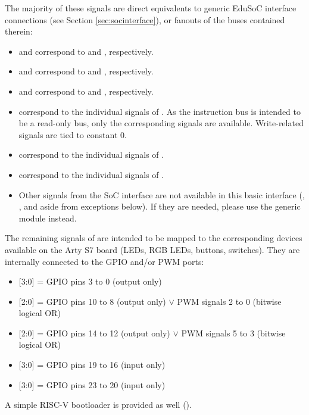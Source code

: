 The majority of these signals are direct equivalents to generic EduSoC interface connections (see Section \ref{sec:socinterface}), or fanouts of the buses contained therein:
\begin{itemize}
    \item {} and  correspond to  and , respectively.
    \item {} and  correspond to  and , respectively.
    \item {} and  correspond to  and , respectively.
    \item {} correspond to the individual signals of . As the instruction bus is intended to be a read-only bus, only the corresponding signals are available. Write-related signals are tied to constant 0.
    \item {} correspond to the individual signals of .
    \item {} correspond to the individual signals of .
    \item Other signals from the SoC interface are not available in this basic interface (, ,  and  aside from exceptions below). If they are needed, please use the generic  module instead.
\end{itemize}
\newpage
The remaining signals of  are intended to be mapped to the corresponding devices available on the Arty S7 board (LEDs, RGB LEDs, buttons, switches). They are internally connected to the GPIO and/or PWM ports:
\begin{itemize}
    \item {}[3:0] = GPIO pins 3 to 0 (output only)
    \item {}[2:0] = GPIO pins 10 to 8 (output only) $\vee$ PWM signals 2 to 0 (bitwise logical OR)
    \item {}[2:0] = GPIO pins 14 to 12 (output only) $\vee$ PWM signals 5 to 3 (bitwise logical OR)
    \item {}[3:0] = GPIO pins 19 to 16 (input only)
    \item {}[3:0] = GPIO pins 23 to 20 (input only)
\end{itemize}

A simple RISC-V bootloader is provided as well ().

